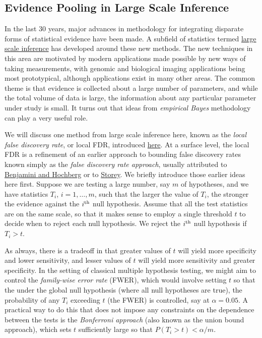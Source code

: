 \subsection{Evidence Pooling in Large Scale Inference}

In the last 30 years, major advances in methodology for integrating disparate forms of statistical evidence have been made. A subfield of statistics termed \href{https://www.cambridge.org/core/books/largescale-inference/A0B183B0080A92966497F12CE5D12589}{large scale inference} has developed around these new methods. The new techniques in this area are motivated by modern applications made possible by new ways of taking measurements, with genomic and biological imaging applications being most prototypical, although applications exist in many other areas. The common theme is that evidence is collected about a large number of parameters, and while the total volume of data is large, the information about any particular parameter under study is small. It turns out that ideas from \textit{empirical Bayes} methodology can play a very useful role.

We will discuss one method from large scale inference here, known as the \textit{local false discovery rate}, or local FDR, introduced \href{https://www.efron.ckirby.su.domains/papers/2005LocalFDR.pdf}{here}. At a surface level, the local FDR is a refinement of an earlier approach to bounding false discovery rates known simply as the \textit{false discovery rate approach}, usually attributed to \href{https://www.jstor.org/stable/2346101}{Benjamini and Hochberg} or to \href{https://www.jstor.org/stable/pdf/3448445.pdf}{Storey}. We briefly introduce those earlier ideas here first. Suppose we are testing a large number, say $m$ of hypotheses, and we have statistics $T_i$, $i=1, \ldots, m$, such that the larger the value of $T_i$, the stronger the evidence against the $i^{\rm th}$ null hypothesis. Assume that all the test statistics are on the same scale, so that it makes sense to employ a single threshold $t$ to decide when to reject each null hypothesis. We reject the $i^{\rm th}$ null hypothesis if $T_i > t$.

As always, there is a tradeoff in that greater values of $t$ will yield more specificity and lower sensitivity, and lesser values of $t$ will yield more sensitivity and greater specificity. In the setting of classical multiple hypothesis testing, we might aim to control the \textit{family-wise error rate} (FWER), which would involve setting $t$ so that the under the global null hypothesis (where all null hypotheses are true), the probability of any $T_i$ exceeding $t$ (the FWER) is controlled, say at $\alpha = 0.05$. A practical way to do this that does not impose any constraints on the dependence between the tests is the {\em Bonferroni approach} (also known as the union bound approach), which sets $t$ sufficiently large so that $P(T_i > t) < \alpha/m$.

